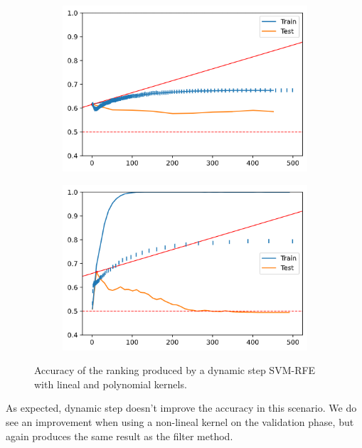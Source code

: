 \begin{figure}[h]
    \centering
    \begin{subfigure}[b]{0.4\linewidth}
        \includegraphics[width=\linewidth]{img/ch5/dstep/madelon-dyn1.png}
    \end{subfigure}
    \begin{subfigure}[b]{0.4\linewidth}
        \includegraphics[width=\linewidth]{img/ch5/dstep/madelon-dyn2.png}
    \end{subfigure}
    \caption{Accuracy of the ranking produced by a dynamic step SVM-RFE with lineal and polynomial kernels.}
    \label{fig:ch5.dstep.madelon.dyn}
\end{figure}

As expected, dynamic step doesn't improve the accuracy in this scenario. We do see an improvement when using a non-lineal kernel on the validation phase, but again produces the same result as the filter method.

